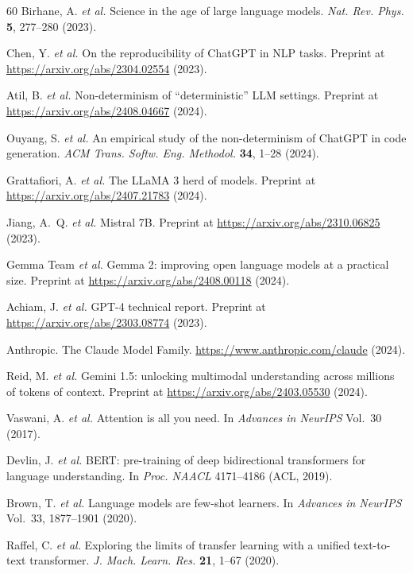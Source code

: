 \documentclass[sn-nature]{sn-jnl}
\begin{document}
\begin{thebibliography}{60}
Birhane, A. \emph{et al.}
Science in the age of large language models.
\emph{Nat. Rev. Phys.} \textbf{5}, 277--280 (2023).

Chen, Y. \emph{et al.}
On the reproducibility of ChatGPT in NLP tasks.
Preprint at \url{https://arxiv.org/abs/2304.02554} (2023).

Atil, B. \emph{et al.}
Non-determinism of ``deterministic'' LLM settings.
Preprint at \url{https://arxiv.org/abs/2408.04667} (2024).

Ouyang, S. \emph{et al.}
An empirical study of the non-determinism of ChatGPT in code generation.
\emph{ACM Trans. Softw. Eng. Methodol.} \textbf{34}, 1--28 (2024).

Grattafiori, A. \emph{et al.}
The LLaMA 3 herd of models.
Preprint at \url{https://arxiv.org/abs/2407.21783} (2024).

Jiang, A.~Q. \emph{et al.}
Mistral 7B.
Preprint at \url{https://arxiv.org/abs/2310.06825} (2023).

Gemma Team \emph{et al.}
Gemma 2: improving open language models at a practical size.
Preprint at \url{https://arxiv.org/abs/2408.00118} (2024).

Achiam, J. \emph{et al.}
GPT-4 technical report.
Preprint at \url{https://arxiv.org/abs/2303.08774} (2023).

Anthropic.
The Claude Model Family.
\url{https://www.anthropic.com/claude} (2024).

Reid, M. \emph{et al.}
Gemini 1.5: unlocking multimodal understanding across millions of tokens of context.
Preprint at \url{https://arxiv.org/abs/2403.05530} (2024).

Vaswani, A. \emph{et al.}
Attention is all you need.
In \emph{Advances in NeurIPS} Vol.~30 (2017).

Devlin, J. \emph{et al.}
BERT: pre-training of deep bidirectional transformers for language understanding.
In \emph{Proc. NAACL} 4171--4186 (ACL, 2019).

Brown, T. \emph{et al.}
Language models are few-shot learners.
In \emph{Advances in NeurIPS} Vol.~33, 1877--1901 (2020).

Raffel, C. \emph{et al.}
Exploring the limits of transfer learning with a unified text-to-text transformer.
\emph{J. Mach. Learn. Res.} \textbf{21}, 1--67 (2020).


\end{thebibliography}
\end{document}
